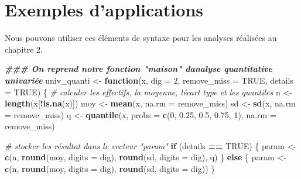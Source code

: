\documentclass[
]{book}
\newenvironment{Shaded}{\begin{snugshade}}{\end{snugshade}}
\newcommand{\AttributeTok}[1]{\textcolor[rgb]{0.13,0.29,0.53}{#1}}
\newcommand{\CommentTok}[1]{\textcolor[rgb]{0.56,0.35,0.01}{\textit{#1}}}
\newcommand{\ConstantTok}[1]{\textcolor[rgb]{0.56,0.35,0.01}{#1}}
\newcommand{\ControlFlowTok}[1]{\textcolor[rgb]{0.13,0.29,0.53}{\textbf{#1}}}
\newcommand{\DecValTok}[1]{\textcolor[rgb]{0.00,0.00,0.81}{#1}}
\newcommand{\DocumentationTok}[1]{\textcolor[rgb]{0.56,0.35,0.01}{\textbf{\textit{#1}}}}
\newcommand{\FloatTok}[1]{\textcolor[rgb]{0.00,0.00,0.81}{#1}}
\newcommand{\FunctionTok}[1]{\textcolor[rgb]{0.13,0.29,0.53}{\textbf{#1}}}
\newcommand{\NormalTok}[1]{#1}
\newcommand{\OtherTok}[1]{\textcolor[rgb]{0.56,0.35,0.01}{#1}}
\newcommand{\SpecialCharTok}[1]{\textcolor[rgb]{0.81,0.36,0.00}{\textbf{#1}}}
\begin{document}
\section{Exemples d'applications}\label{exemples-dapplications}

Nous pouvons utiliser ces éléments de syntaxe pour les analyses réalisées au chapitre 2.

\begin{Shaded}
\begin{Highlighting}[]
\DocumentationTok{\#\#\# On reprend notre fonction "maison" d\textquotesingle{}analyse quantitative univariée }
\NormalTok{univ\_quanti }\OtherTok{\textless{}{-}} \ControlFlowTok{function}\NormalTok{(x, }\AttributeTok{dig =} \DecValTok{2}\NormalTok{, }\AttributeTok{remove\_miss =} \ConstantTok{TRUE}\NormalTok{, }\AttributeTok{details =} \ConstantTok{TRUE}\NormalTok{) \{ }
  \CommentTok{\# calculer les effectifs, la moyenne, l\textquotesingle{}écart type et les quantiles}
\NormalTok{  n }\OtherTok{\textless{}{-}} \FunctionTok{length}\NormalTok{(x[}\SpecialCharTok{!}\FunctionTok{is.na}\NormalTok{(x)])    }
\NormalTok{  moy }\OtherTok{\textless{}{-}} \FunctionTok{mean}\NormalTok{(x, }\AttributeTok{na.rm =}\NormalTok{ remove\_miss)}
\NormalTok{  sd }\OtherTok{\textless{}{-}} \FunctionTok{sd}\NormalTok{(x, }\AttributeTok{na.rm =}\NormalTok{ remove\_miss)}
\NormalTok{  q }\OtherTok{\textless{}{-}} \FunctionTok{quantile}\NormalTok{(x, }\AttributeTok{probs =} \FunctionTok{c}\NormalTok{(}\DecValTok{0}\NormalTok{, }\FloatTok{0.25}\NormalTok{, }\FloatTok{0.5}\NormalTok{, }\FloatTok{0.75}\NormalTok{, }\DecValTok{1}\NormalTok{), }\AttributeTok{na.rm =}\NormalTok{ remove\_miss)}
  
  \CommentTok{\# stocker les résultat dans le vecteur "param"}
  \ControlFlowTok{if}\NormalTok{ (details }\SpecialCharTok{==} \ConstantTok{TRUE}\NormalTok{) \{}
\NormalTok{    param }\OtherTok{\textless{}{-}} \FunctionTok{c}\NormalTok{(n, }
               \FunctionTok{round}\NormalTok{(moy, }\AttributeTok{digits =}\NormalTok{ dig), }
               \FunctionTok{round}\NormalTok{(sd, }\AttributeTok{digits =}\NormalTok{ dig), }
\NormalTok{               q)}
\NormalTok{  \} }\ControlFlowTok{else}\NormalTok{ \{}
\NormalTok{    param }\OtherTok{\textless{}{-}} \FunctionTok{c}\NormalTok{(n, }
               \FunctionTok{round}\NormalTok{(moy, }\AttributeTok{digits =}\NormalTok{ dig), }
               \FunctionTok{round}\NormalTok{(sd, }\AttributeTok{digits =}\NormalTok{ dig))}
\NormalTok{  \}}
  

\end{Highlighting}
\end{Shaded}
\end{document}
